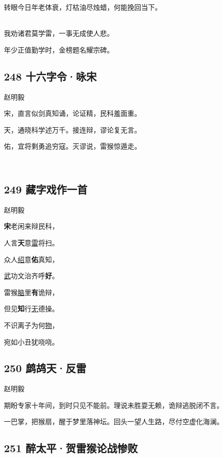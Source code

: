 转眼今日年老体衰，灯枯油尽烛蜡，何能挽回当下。

~\\
我劝诸君莫学雷，一事无成使人悲。

年少正值勤学时，金榜题名耀宗碑。

\hypertarget{ux5341ux516dux5b57ux4ee4ux548fux5b8b}{%
\subsection{248
十六字令·咏宋}\label{ux5341ux516dux5b57ux4ee4ux548fux5b8b}}

{赵明毅}

宋，直言似剑真知诵，论证精，民科羞面重。

天，通晓科学述万千。接连辩，谬论复无言。

佑，宜将剩勇追穷寇。灭谬说，雷猴惊遁走。

~\\

\hypertarget{ux85cfux5b57ux620fux4f5cux4e00ux9996}{%
\subsection{249
藏字戏作一首}\label{ux85cfux5b57ux620fux4f5cux4e00ux9996}}

{赵明毅}

\textbf{宋}老闲来辩民科，

人言\textbf{天}意\underline{雷}将扫。

众人\underline{绍}意\textbf{佑}真知，

\underline{武}功文治齐呼\textbf{好}。

雷猴\underline{脑}里\textbf{有}诡辩，

但见\textbf{知}行\underline{无}德操。

不识离子为何\underline{物}，

宛如小丑犹哓哓。

\hypertarget{ux9e67ux9e2aux5929ux53cdux96f7}{%
\subsection{250 鹧鸪天·反雷}\label{ux9e67ux9e2aux5929ux53cdux96f7}}

{赵明毅}

期盼专家十年间，到时只见不能前。理说未胜耍无赖，诡辩逃脱闭不言。

一巴掌，把猴扇，醒于梦里落神坛。回头一望人生路，尽付空虚化海澜。

\hypertarget{ux9189ux592aux5e73ux8d3aux96f7ux7334ux8bbaux6218ux60e8ux8d25}{%
\subsection{251
醉太平·贺雷猴论战惨败}\label{ux9189ux592aux5e73ux8d3aux96f7ux7334ux8bbaux6218ux60e8ux8d25}}

